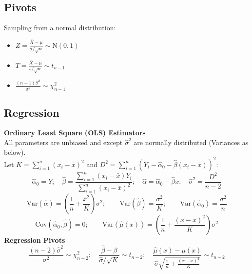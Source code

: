 \documentclass{article}
\begin{document}
\begin{multicols*}{2}
\subsection*{Pivots}
Sampling from a normal distribution:
\begin{itemize}
    \item $Z = \frac{\bar{X} - \mu}{\sigma / \sqrt{n}} \sim \mbox{N}(0, 1)$
    \item $T = \frac{\bar{X} - \mu}{s / \sqrt{n}} \sim t_{n-1}$
    \item $\frac{(n-1)S^{2}}{\sigma^{2}} \sim \chi^{2}_{n-1}$
\end{itemize}

\subsection*{Regression}
\textbf{Ordinary Least Square (OLS) Estimators}\\
All parameters are unbiased and except $\hat{\sigma}^{2}$ are normally distributed (Variances as below).\\
Let $K = \sum_{i=1}^{n}(x_{i}-\bar{x})^{2}$ and $D^{2} = \sum_{i=1}^{n}(Y_{i} - \hat{\alpha}_{0} - \hat{\beta}(x_{i} - \bar{x}))^{2}$:
$$\hat{\alpha}_{0} = \bar{Y}; \quad \hat{\beta} = \frac{\sum_{i=1}^{n}(x_{i}-\bar{x})Y_{i}}{\sum_{i=1}^{n}(x_{i}-\bar{x})^{2}}; \quad \hat{\alpha} = \hat{\alpha}_{0} - \hat{\beta}\bar{x}; \quad \hat{\sigma}^{2} = \frac{D^{2}}{n-2}$$
$$\mbox{Var}(\hat{\alpha}) = \left( \frac{1}{n} + \frac{\bar{x}^{2}}{K} \right) \sigma^{2}; \qquad \mbox{Var}(\hat{\beta}) = \frac{\sigma^{2}}{K}; \qquad \mbox{Var}(\hat{\alpha}_{0}) = \frac{\sigma^{2}}{n}$$
$$\mbox{Cov}(\hat{\alpha}_{0}, \hat{\beta}) = 0; \qquad \mbox{Var}(\hat{\mu}(x)) = \left( \frac{1}{n} + \frac{(x-\bar{x})^{2}}{K} \right) \sigma^{2}$$
\textbf{Regression Pivots}\\
$$\frac{(n-2)\hat{\sigma}^{2}}{\sigma^{2}} \sim \chi^{2}_{n-2}; \quad \frac{\hat{\beta} - \beta}{\hat{\sigma} / \sqrt{K}} \sim t_{n-2}; \quad \frac{\hat{\mu}(x) - \mu(x)}{\hat{\sigma} \sqrt{\frac{1}{n} + \frac{(x - \bar{x})^{2}}{K}}} \sim t_{n-2}$$


\end{multicols*}
\end{document}
